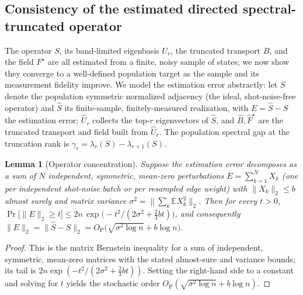 \documentclass[aps,prresearch,reprint,amsmath,amssymb,nofootinbib,superscriptaddress,floatfix]{revtex4-2}
\newtheorem{lemma}[theorem]{Lemma}
\theoremstyle{definition}
\theoremstyle{remark}
\theoremstyle{plain}
\begin{document}
\subsection{Consistency of the estimated directed spectral-truncated operator}
\label{ssub:estconsistency}
The operator $S$, its band-limited eigenbasis $U_r$, the truncated transport $B$, and the field $F^\star$
are all estimated from a finite, noisy sample of states; we now show they converge to a well-defined
population target as the sample and its measurement fidelity improve. We model the estimation error abstractly:
let $S$ denote the population symmetric normalized adjacency (the ideal, shot-noise-free operator) and
$\widehat S$ its finite-sample, finitely-measured realization, with $E=\widehat S-S$ the estimation error;
$\widehat U_r$ collects the top-$r$ eigenvectors of $\widehat S$, and $\widehat B,\widehat F^\star$ are the
truncated transport and field built from $\widehat U_r$. The population spectral gap at the truncation rank
is $\gamma_r=\lambda_r(S)-\lambda_{r+1}(S)$.

\begin{lemma}[Operator concentration]
\label{lem:conc}
Suppose the estimation error decomposes as a sum of $N$ independent, symmetric, mean-zero perturbations
$E=\sum_{k=1}^N X_k$ (one per independent shot-noise batch or per resampled edge weight) with
$\|X_k\|_2\le b$ almost surely and matrix variance
$\sigma^2=\big\|\sum_k\mathbb E X_k^2\big\|_2$. Then for every $t>0$,
$\Pr\big[\|E\|_2\ge t\big]\le 2n\,\exp\!\big(-t^2/(2\sigma^2+\tfrac23 bt)\big)$, and consequently
$\|E\|_2=\|\widehat S-S\|_2=O_{\mathrm P}\big(\sqrt{\sigma^2\log n}+b\log n\big)$.
\end{lemma}
\begin{proof}
This is the matrix Bernstein inequality \cite{tropp2015introduction} for a sum of independent, symmetric,
mean-zero matrices with the stated almost-sure and variance bounds; its tail is
$2n\exp(-t^2/(2\sigma^2+\tfrac23 bt))$. Setting the right-hand side to a constant and solving for $t$ yields
the stochastic order $O_{\mathrm P}(\sqrt{\sigma^2\log n}+b\log n)$.
\end{proof}
\end{document}
